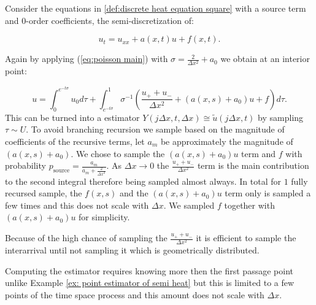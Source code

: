 \documentclass[a4paper,12pt]{article}
\begin{document}
\begin{example} \label{ex:semi heat source}

  Consider the equations in \ref{def:discrete heat equation square} with a source term and $0$-order coefficients, the
  semi-discretization of:

  \begin{equation}
    u_{t} = u_{xx} + a(x,t)u + f(x,t)
    .
  \end{equation}

  Again by applying (\ref{eq:poisson main}) with $\sigma = \frac{2}{\Delta x^{2}} +a_{0}$
  we obtain at an interior point:

  \begin{equation} \label{eq:int semi heat source}
    u =
    \int_{0}^{e^{-t \sigma }} u_{0} d\tau  + \int_{e^{-t \sigma }}^{1}
    \sigma^{-1}
    \left(
    \frac{u_{+} + u_{-}}{\Delta x^{2}} +(a(x,s)+ a_{0}) u+ f
    \right)
    d\tau
    .
  \end{equation}
  This can be turned into a estimator $Y(j \Delta x,t,\Delta x ) \cong  \tilde{u}(j \Delta x,t)$
  by sampling $\tau \sim U$.
  To avoid branching recursion we sample
  based on the magnitude of coefficients of the recursive terms, let $a_m$ be approximately the magnitude of
  $(a(x,s)+ a_{0})$. We chose to sample the $(a(x,s)+ a_{0})u$ term and $f$
  with probability $p_{\text{source}} = \frac{a_m}{a_m + \frac{2}{\Delta x^{2}}}$.
  As $\Delta x \rightarrow 0$ the $\frac{u_{+} + u_{-}}{\Delta x^{2}}$ term is
  the main contribution to the second integral therefore
  being sampled almost always.
  In total for $1$ fully recursed sample,
  the $f(x,s)$ and the $(a(x,s)+ a_{0})u$ term only
  is sampled a few times and this does not scale with $\Delta x$. We
  sampled $f$ together with $(a(x,s)+ a_{0})u$ for simplicity.
\end{example}

\begin{julia}\label{jl:point estimator heat source}
  Because of the high chance of sampling the $\frac{u_{+} + u_{-}}{\Delta x^{2}}$ it is efficient
  to sample the interarrival until not sampling it which is geometrically distributed.

\end{julia}

Computing the estimator requires knowing more then the first passage point
unlike Example \ref{ex: point estimator of semi heat} but this is limited
to a few points of the time space process and this amount does not scale with $\Delta x$.
\end{document}
